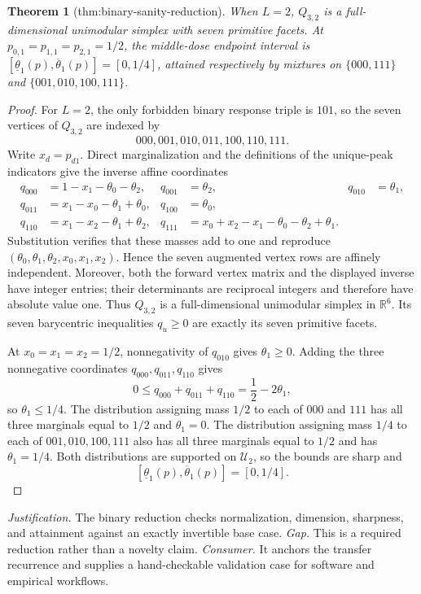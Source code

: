 \documentclass{article}
\newtheorem{theorem}{Theorem}
\begin{document}
\begin{theorem}[thm:binary-sanity-reduction]\label{thm:binary-sanity-reduction}
When \(L=2\), \(Q_{3,2}\) is a full-dimensional unimodular simplex with seven primitive facets. At \(p_{0,1}=p_{1,1}=p_{2,1}=1/2\), the middle-dose endpoint interval is \([\underline\theta_1(p),\overline\theta_1(p)]=[0,1/4]\), attained respectively by mixtures on \(\{000,111\}\) and \(\{001,010,100,111\}\).
\end{theorem}
\begin{proof}
For \(L=2\), the only forbidden binary response triple is \(101\), so the seven vertices of \(Q_{3,2}\) are indexed by
\[
 000,001,010,011,100,110,111.
\]
Write \(x_d=p_{d1}\).  Direct marginalization and the definitions of the unique-peak indicators give the inverse affine coordinates
\[
\begin{aligned}
 q_{000}&=1-x_1-\theta_0-\theta_2,&q_{001}&=\theta_2,&q_{010}&=\theta_1,\\
 q_{011}&=x_1-x_0-\theta_1+\theta_0,&q_{100}&=\theta_0,\\
 q_{110}&=x_1-x_2-\theta_1+\theta_2,&
 q_{111}&=x_0+x_2-x_1-\theta_0-\theta_2+\theta_1.
\end{aligned}
\]
Substitution verifies that these masses add to one and reproduce \((\theta_0,\theta_1,\theta_2,x_0,x_1,x_2)\).  Hence the seven augmented vertex rows are affinely independent.  Moreover, both the forward vertex matrix and the displayed inverse have integer entries; their determinants are reciprocal integers and therefore have absolute value one.  Thus \(Q_{3,2}\) is a full-dimensional unimodular simplex in \(\mathbb R^6\).  Its seven barycentric inequalities \(q_u\ge0\) are exactly its seven primitive facets.

At \(x_0=x_1=x_2=1/2\), nonnegativity of \(q_{010}\) gives \(\theta_1\ge0\).  Adding the three nonnegative coordinates \(q_{000},q_{011},q_{110}\) gives
\[
 0\le q_{000}+q_{011}+q_{110}
   =\frac12-2\theta_1,
\]
so \(\theta_1\le1/4\).  The distribution assigning mass \(1/2\) to each of \(000\) and \(111\) has all three marginals equal to \(1/2\) and \(\theta_1=0\).  The distribution assigning mass \(1/4\) to each of \(001,010,100,111\) also has all three marginals equal to \(1/2\) and has \(\theta_1=1/4\).  Both distributions are supported on \(\mathcal U_2\), so the bounds are sharp and
\[
 [\underline\theta_1(p),\overline\theta_1(p)]=[0,1/4].
\]
\end{proof}
\par\smallskip\noindent \textit{Justification.} The binary reduction checks normalization, dimension, sharpness, and attainment against an exactly invertible base case. \textit{Gap.} This is a required reduction rather than a novelty claim. \textit{Consumer.} It anchors the transfer recurrence and supplies a hand-checkable validation case for software and empirical workflows.
\end{document}
